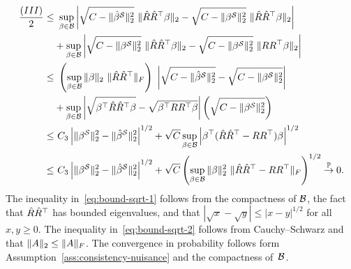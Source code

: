 \begin{align}
    \frac{(III)}{2} 
 \leq 
 &\
 \sup_{\beta \in \mathcal{B}}
 \left|
 \sqrt{C - \|\hat{\beta}^{\mathcal{S}}\|_2^2}\ \|\hat{R}\hat{R}^\top \beta\|_2
  - \sqrt{C - \|\beta^{\mathcal{S}}\|_2^2}\ \|\hat{R}\hat{R}^\top \beta\|_2
 \right| \notag\\
 &+
  \sup_{\beta \in \mathcal{B}}
 \left|
 \sqrt{C - \|\beta^{\mathcal{S}}\|_2^2}\ \|\hat{R}\hat{R}^\top \beta\|_2
  - \sqrt{C - \|\beta^{\mathcal{S}}\|_2^2}\ \|RR^\top \beta\|_2
 \right| \notag\\
 \leq &\
 \left(\sup_{\beta \in \mathcal{B}} \|\beta\|_2\ \|\hat{R}\hat{R}^\top\|_F\right)\
 \left|
 \sqrt{C - \|\hat{\beta}^{\mathcal{S}}\|_2^2} 
 - 
 \sqrt{C - \|\beta^{\mathcal{S}}\|_2^2}
 \right|
 \notag\\
 &+\sup_{\beta \in \mathcal{B}}
 \left|
 \sqrt{\beta^\top \hat{R}\hat{R}^\top  \beta}
 -
 \sqrt{\beta^\top RR^\top \beta}
 \right|
 \left(
 \sqrt{C - \|\beta^{\mathcal{S}}\|_2^2}\right)\notag\\
 \leq &\
 C_3 
 \left| \|\beta^{\mathcal{S}}\|_2^2 - \|\hat{\beta}^{\mathcal{S}}\|_2^2
 \right|^{1/2}
 + 
 \sqrt{C} 
 \sup_{\beta \in \mathcal{B}} 
  \left|
 \beta^\top ( \hat{R}\hat{R}^\top- RR^\top) \beta
  \right|^{1/2}
  \label{eq:bound-sqrt-1}\\
  \leq &\
   C_3 
 \left| \|\beta^{\mathcal{S}}\|_2^2 - \|\hat{\beta}^{\mathcal{S}}\|_2^2
 \right|^{1/2}
 + 
 \sqrt{C} 
 \left(
    \sup_{\beta \in \mathcal{B}} \|\beta\|_2^2\ \| \hat{R}\hat{R}^\top- RR^\top\|_F
 \right)^{1/2} \stackrel{\mathbb{P}}{\to} 0.\label{eq:bound-sqrt-2}
\end{align}
The inequality in~\eqref{eq:bound-sqrt-1} follows from the compactness of $\mathcal{B}$, the fact that $\hat{R}\hat{R}^\top$ has bounded eigenvalues, and that $|\sqrt{x} - \sqrt{y}| \leq |x - y|^{1/2}$ for all $x, y \geq 0$.
The inequality in~\eqref{eq:bound-sqrt-2} follows from Cauchy--Schwarz and that $\|A\|_2 \leq \|A\|_F$.
The convergence in probability follows form Assumption~\ref{ass:consistency-nuisance} and the compactness of~$\mathcal{B}$.



